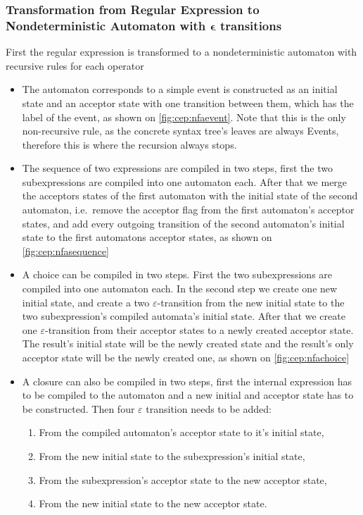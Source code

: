 		\subsubsection{Transformation from Regular Expression to Nondeterministic Automaton with $\bm{\epsilon}$ transitions}
		\label{section:re2nfa}
		First the regular expression is transformed to a nondeterministic automaton with recursive rules for each operator
		\begin{itemize}
			\item The automaton corresponds to a simple event is constructed as an initial state and an acceptor state with one transition between them, which has the label of the event, as shown on \cref{fig:cep:nfaevent}. Note that this is the only non-recursive rule, as the concrete syntax tree's leaves are always Events, therefore this is where the recursion always stops.
			\item The sequence of two expressions are compiled in two steps, first the two subexpressions are compiled into one automaton each. After that we merge the acceptors states of the first automaton with the initial state of the second automaton, i.e.~remove the acceptor flag from the first automaton's acceptor states, and add every outgoing transition of the second automaton's initial state to the first automatons acceptor states, as shown on \cref{fig:cep:nfasequence}
			\item A choice can be compiled in two steps. First the two subexpressions are compiled into one automaton each. In the second step we create one new initial state, and create a two $\varepsilon$-transition from the new initial state to the two subexpression's compiled automata's initial state. After that we create one $\varepsilon$-transition from their acceptor states to a newly created acceptor state. The result's initial state will be the newly created state and the result's only acceptor state will be the newly created one, as shown on \cref{fig:cep:nfachoice}
			\item A closure can also be compiled in two steps, first the internal expression has to be compiled to the automaton and a new initial and acceptor state has to be constructed. Then four $\varepsilon$ transition needs to be added:
			\begin{enumerate}
				\item From the compiled automaton's acceptor state to it's initial state,
				\item From the new initial state to the subexpression's initial state,
				\item From the subexpression's acceptor state to the new acceptor state,
				\item From the new initial state to the new acceptor state.
			\end{enumerate}
		\end{itemize}
	
